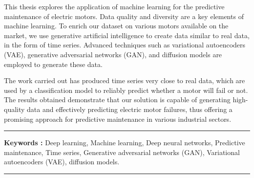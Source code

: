 \medskip

This thesis explores the application of machine learning for the predictive
maintenance of electric motors. Data quality  and diversity  are a key elements of machine
learning. To enrich our dataset on various motors available on the market, we
use generative artificial intelligence to create data similar to real data, in
the form of time series. Advanced techniques such as variational autoencoders
(VAE), generative adversarial networks (GAN), and diffusion models 
are employed to generate these data.

\medskip

The work carried out has produced time series very close to real data, which
are used by a classification model to reliably predict whether a motor will
fail or not. The results obtained demonstrate that our solution is capable of
generating high-quality data and effectively predicting electric motor
failures, thus offering a promising approach for predictive maintenance in
various industrial sectors.


\vspace{1cm}

\noindent\rule[2pt]{\textwidth}{0.5pt}

{\textbf{Keywords :}}
Deep learning, Machine learning, Deep neural networks, Predictive maintenance,
Time series, Generative adversarial networks (GAN), Variational autoencoders (VAE), diffusion models.
\\

\noindent\rule[2pt]{\textwidth}{0.5pt}

